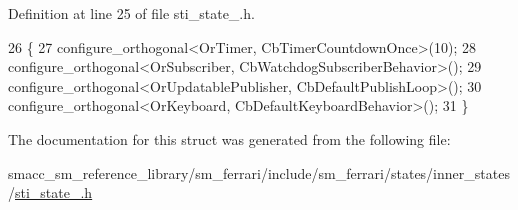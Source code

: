 Definition at line 25 of file sti\+\_\+state\+\_.\+h.


\begin{DoxyCode}
26   \{
27     configure\_orthogonal<OrTimer, CbTimerCountdownOnce>(10);
28     configure\_orthogonal<OrSubscriber, CbWatchdogSubscriberBehavior>();
29     configure\_orthogonal<OrUpdatablePublisher, CbDefaultPublishLoop>();
30     configure\_orthogonal<OrKeyboard, CbDefaultKeyboardBehavior>();
31   \}
\end{DoxyCode}


The documentation for this struct was generated from the following file\+:\begin{DoxyCompactItemize}
\item 
smacc\+\_\+sm\+\_\+reference\+\_\+library/sm\+\_\+ferrari/include/sm\+\_\+ferrari/states/inner\+\_\+states/\hyperlink{sm__ferrari_2include_2sm__ferrari_2states_2inner__states_2sti__state__3_8h}{sti\+\_\+state\+\_.\+h}\end{DoxyCompactItemize}
